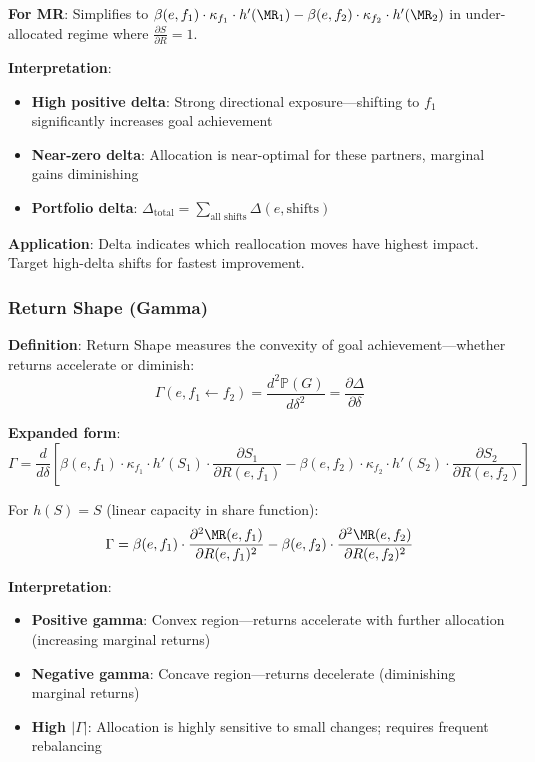 \textbf{For MR}: Simplifies to $\beta(e,f_1) \cdot \kappa_{f_1} \cdot h'(\MR_1) - \beta(e,f_2) \cdot \kappa_{f_2} \cdot h'(\MR_2)$ in under-allocated regime where $\frac{\partial S}{\partial R} = 1$.

\textbf{Interpretation}:
\begin{itemize}
\item \textbf{High positive delta}: Strong directional exposure---shifting to $f_1$ significantly increases goal achievement
\item \textbf{Near-zero delta}: Allocation is near-optimal for these partners, marginal gains diminishing
\item \textbf{Portfolio delta}: $\Delta_{\text{total}} = \sum_{\text{all shifts}} \Delta(e, \text{shifts})$
\end{itemize}

\textbf{Application}: Delta indicates which reallocation moves have highest impact. Target high-delta shifts for fastest improvement.

\subsubsection{Return Shape (Gamma)}

\textbf{Definition}: Return Shape measures the convexity of goal achievement---whether returns accelerate or diminish:
\[ \Gamma(e, f_1 \leftarrow f_2) = \frac{d^2\mathbb{P}(G)}{d\delta^2} = \frac{\partial \Delta}{\partial \delta} \]

\textbf{Expanded form}:
\[ \Gamma = \frac{d}{d\delta}\left[\beta(e,f_1) \cdot \kappa_{f_1} \cdot h'(S_1) \cdot \frac{\partial S_1}{\partial R(e,f_1)} - \beta(e,f_2) \cdot \kappa_{f_2} \cdot h'(S_2) \cdot \frac{\partial S_2}{\partial R(e,f_2)}\right] \]

For $h(S) = S$ (linear capacity in share function):
\[ \Gamma = \beta(e,f_1) \cdot \frac{\partial^2 \MR(e,f_1)}{\partial R(e,f_1)^2} - \beta(e,f_2) \cdot \frac{\partial^2 \MR(e,f_2)}{\partial R(e,f_2)^2} \]

\textbf{Interpretation}:
\begin{itemize}
\item \textbf{Positive gamma}: Convex region---returns accelerate with further allocation (increasing marginal returns)
\item \textbf{Negative gamma}: Concave region---returns decelerate (diminishing marginal returns)
\item \textbf{High $|\Gamma|$}: Allocation is highly sensitive to small changes; requires frequent rebalancing
\end{itemize}

